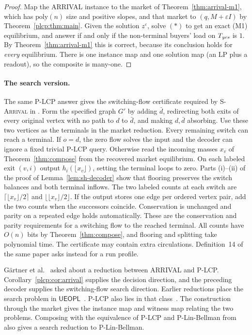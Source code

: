 \begin{proof}
Map the ARRIVAL instance to the market of Theorem~\ref{thm:arrival-m1}, which has $\mathrm{poly}(n)$
size and positive slopes, and that market to $(q,M+\varepsilon I)$ by Theorem~\ref{plcp:thm:main}. Given
the solution $z^\varepsilon$, solve $(\ast)$ to get an exact (M1) equilibrium, and answer \yes{} if and
only if the non-terminal buyers' load on $T_{\textit{yes}}$ is $1$. By Theorem~\ref{thm:arrival-m1} this is
correct, because its conclusion holds for \emph{every} equilibrium. There is one instance map and one
solution map (an LP plus a readout), so the composite is many-one.
\end{proof}

\paragraph{The search version.}\label{par:search-arrival}
The same P-LCP answer gives the switching-flow certificate required by
\textsc{S-Arrival} in \cite[Definition~13]{ghhkms18}. Form the specified
graph $G'$ by adding $\bar d$, redirecting both exits of every original
vertex with no path to $d$ to $\bar d$, and making $d,\bar d$ absorbing.
Use these two vertices as the terminals in the market reduction. Every
remaining switch can reach a terminal. If $o=d$, the zero flow solves the
input and the decoder can ignore a fixed trivial P-LCP query.
Otherwise read the incoming masses $x_v$ of Theorem~\ref{thm:compose}
from the recovered market equilibrium. On each labeled exit $(v,i)$
output $h_i(\lfloor x_v\rfloor)$, setting the terminal loops to zero.
Parts (i)--(ii) of the proof of Lemma~\ref{lem:sh-decoder} show that flooring
preserves the switch balances and both terminal inflows. The two
labeled counts at each switch are $\lceil\lfloor x_v\rfloor/2\rceil$
and $\lfloor\lfloor x_v\rfloor/2\rfloor$. If the output stores one
edge per ordered vertex pair, add the two counts when the successors
coincide. Conservation is unchanged and parity on a repeated edge
holds automatically. These are the conservation and parity requirements for a
switching flow to the reached terminal. All counts have $O(n)$ bits
by Theorem~\ref{thm:compose}, and flooring and splitting take polynomial
time. The certificate may contain extra circulations. Definition~14
of the same paper asks instead for a run profile.

G\"artner et al.~\cite[Section~6]{ghhkms18} asked about a reduction
between ARRIVAL and P-LCP. Corollary~\ref{plcp:cor:arrival} supplies
the decision direction, and the preceding decoder supplies the
switching-flow search direction. Earlier reductions place the search
problem in $\mathsf{UEOPL}$~\cite{ghhkms18,fgms18}. P-LCP also lies in
that class~\cite{fgms18}. The construction through the market gives
the instance map and witness map relating the two problems. Composing
with the equivalence of P-LCP and P-Lin-Bellman
from~\cite{bfgssw24} also gives a search reduction to P-Lin-Bellman.

